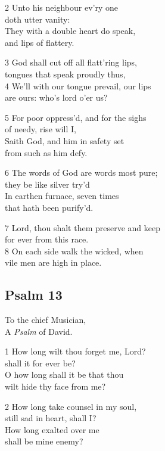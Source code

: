 \begin{multicols}{3}
2 Unto his neighbour ev’ry one\\
doth utter vanity:\\
They with a double heart do speak,\\
and lips of flattery.

3 God shall cut off all flatt’ring lips,\\
tongues that speak proudly thus,\\
4 We’ll with our tongue prevail, our lips\\
are ours: who’s lord o’er us?

5 For poor oppress’d, and for the sighs\\
of needy, rise will I,\\
Saith God, and him in safety set\\
from such as him defy.

6 The words of God are words most pure;\\
they be like silver try’d\\
In earthen furnace, seven times\\
that hath been purify’d.

7 Lord, thou shalt them preserve and keep\\
for ever from this race.\\
8 On each side walk the wicked, when\\
vile men are high in place.

\begin{center}
\quad{}\quad{}
\end{center}

\subsection*{Psalm 13 }

To the chief Musician,\\
A \emph{Psalm} of David.

1 How long wilt thou forget me, Lord?\\
shall it for ever be?\\
O how long shall it be that thou\\
wilt hide thy face from me?

2 How long take counsel in my soul,\\
still sad in heart, shall I?\\
How long exalted over me\\
shall be mine enemy?


\end{multicols}
